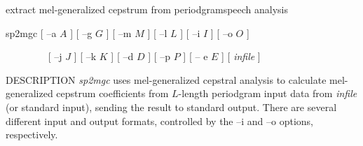 % 
% 
% 
% 
%                                                                        
%
\hypertarget{sp2mgc}{}
%
{extract mel-generalized cepstrum from periodgram}{speech analysis}

\begin{synopsis}
\item[sp2mgc]   [ --a $A$ ] [ --g $G$ ] [ --m $M$ ] [ --l $L$ ] 
	       [ --i $I$ ] [ --o $O$ ]
\item[\ ~~~~~~~] [ --j $J$ ] [ --k $K$ ] [ --d $D$ ] [ --p $P$ ] [ -- e $E$ ] 
		 [ {\em infile} ]
\end{synopsis}

\begin{qsection}{DESCRIPTION}
{\em sp2mgc} uses mel-generalized cepstral analysis 
to calculate mel-generalized cepstrum coefficients 
from $L$-length periodgram input data 
from {\em infile} (or standard input), 
sending the result to standard output. 
There are several different input and output formats,
controlled by the --i and --o options, respectively.
\end{qsection}

